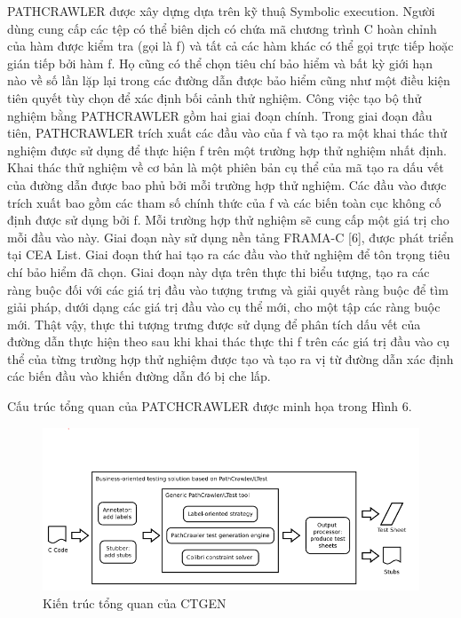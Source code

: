 \documentclass[12pt,a4paper]{article}
\begin{document}
\indent PATHCRAWLER được xây dựng dựa trên kỹ thuậ Symbolic execution. Người dùng cung cấp các tệp có thể biên dịch có chứa mã chương trình C hoàn chỉnh của hàm được kiểm tra (gọi là f) và tất cả các hàm khác có thể gọi trực tiếp hoặc gián tiếp bởi hàm f. Họ cũng có thể chọn tiêu chí bảo hiểm và bất kỳ giới hạn nào về số lần lặp lại trong các đường dẫn được bảo hiểm cũng như một điều kiện tiên quyết tùy chọn để xác định bối cảnh thử nghiệm. Công việc tạo bộ thử nghiệm bằng PATHCRAWLER gồm hai giai đoạn chính. Trong giai đoạn đầu tiên, PATHCRAWLER trích xuất các đầu vào của f và tạo ra một khai thác thử nghiệm được sử dụng để thực hiện f trên một trường hợp thử nghiệm nhất định. Khai thác thử nghiệm về cơ bản là một phiên bản cụ thể của mã tạo ra dấu vết của đường dẫn được bao phủ bởi mỗi trường hợp thử nghiệm. Các đầu vào được trích xuất bao gồm các tham số chính thức của f và các biến toàn cục không cố định được sử dụng bởi f. Mỗi trường hợp thử nghiệm sẽ cung cấp một giá trị cho mỗi đầu vào này. Giai đoạn này sử dụng nền tảng FRAMA-C [6], được phát triển tại CEA List. Giai đoạn thứ hai tạo ra các đầu vào thử nghiệm để tôn trọng tiêu chí bảo hiểm đã chọn.  Giai đoạn này dựa trên thực thi biểu tượng, tạo ra các ràng buộc đối với các giá trị đầu vào tượng trưng và giải quyết ràng buộc để tìm giải pháp, dưới dạng các giá trị đầu vào cụ thể mới, cho một tập các ràng buộc mới. Thật vậy, thực thi tượng trưng được sử dụng để phân tích dấu vết của đường dẫn thực hiện theo sau khi khai thác thực thi f trên các giá trị đầu vào cụ thể của từng trường hợp thử nghiệm được tạo và tạo ra vị từ đường dẫn xác định các biến đầu vào khiến đường dẫn đó bị che lấp.

\indent Cấu trúc tổng quan của PATCHCRAWLER được minh họa trong Hình 6.
\begin{figure}[ht]
\begin{center}
\includegraphics[scale=.7]{hinhanh/pathcrawler}
\end{center}
\caption{Kiến trúc tổng quan của CTGEN}
\end{figure}
\end{document}
